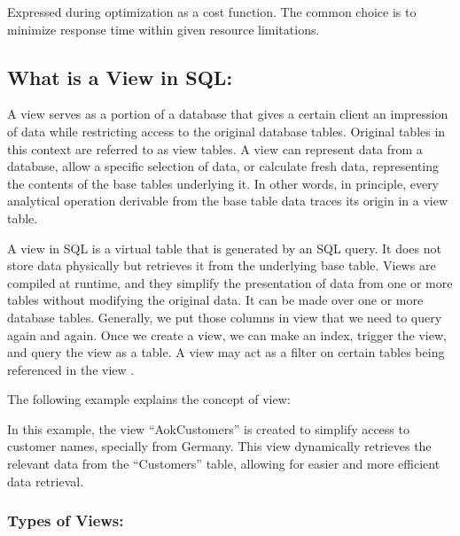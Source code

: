 Expressed during optimization as a cost function. The common choice is to minimize response time within given resource limitations.



\subsection{What is a View in SQL:}
A view serves as a portion of a database that gives a certain client an impression of data while restricting access to the original database tables. Original tables in this context are referred to as view tables. A view can represent data from a database, allow a specific selection of data, or calculate fresh data, representing the contents of the base tables underlying it. In other words, in principle, every analytical operation derivable from the base table data traces its origin in a view table.\vspace{.4cm}

A view in SQL is a virtual table that is generated by an SQL query. It does not store data physically but retrieves it from the underlying base table. Views are compiled at runtime, and they simplify the presentation of data from one or more tables without modifying the original data. It can be made over one or more database tables. Generally, we put those columns in view that we need to query again and again. Once we create a view, we can make an index, trigger the view, and query the view as a table. A view may act as a filter on certain tables being referenced in the view \cite{chauhan-2024, Rohan_Vats-2024}.\vspace{.4cm}


The following example explains the concept of view:



 In this example, the view ``AokCustomers'' is created to simplify access to customer names, specially from Germany. This view dynamically retrieves the relevant data from the ``Customers'' table, allowing for easier and more efficient data retrieval.
 
\subsubsection{Types of Views:}

